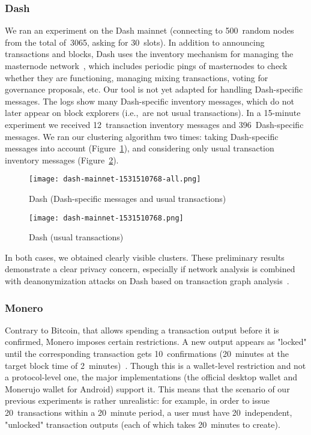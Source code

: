 \subsubsection{Dash}

We ran an experiment on the Dash mainnet (connecting to 500~random nodes from the total of~3065, asking for 30~slots).
In addition to announcing transactions and blocks, Dash uses the inventory mechanism for managing the masternode network~\cite{Schinzel2015}, which includes periodic pings of masternodes to check whether they are functioning, managing mixing transactions, voting for governance proposals, etc.
Our tool is not yet adapted for handling Dash-specific messages.
The logs show many Dash-specific inventory messages, which do not later appear on block explorers (i.e.,~are not usual transactions).
In a 15-minute experiment we received  12~transaction inventory messages and 396~Dash-specific messages.
We ran our clustering algorithm two times: taking Dash-specific messages into account (Figure~\ref{fig:dash-all}), and considering only usual transaction inventory messages (Figure~\ref{fig:dash-tx}).

\begin{figure}[!t]
	\texttt{[image: dash-mainnet-1531510768-all.png]}
	\caption{Dash (Dash-specific messages and usual transactions)}
	\label{fig:dash-all}
\end{figure}

\begin{figure}[!t]
	\texttt{[image: dash-mainnet-1531510768.png]}
	\caption{Dash (usual transactions)}
	\label{fig:dash-tx}
\end{figure}

In both cases, we obtained clearly visible clusters.
These preliminary results demonstrate a clear privacy concern, especially if network analysis is combined with deanonymization attacks on Dash based on transaction graph analysis~\cite{Kalodner2017}. 


\subsubsection{Monero}

Contrary to Bitcoin, that allows spending a transaction output before it is confirmed, Monero imposes certain restrictions.
A new output appears as "locked" until the corresponding transaction gets 10~confirmations (20~minutes at the target block time of 2~minutes)~\cite{dpzz2017}.
Though this is a wallet-level restriction and not a protocol-level one, the major implementations (the official desktop wallet and Monerujo wallet for Android) support it.
This means that the scenario of our previous experiments is rather unrealistic: for example, in order to issue 20~transactions within a 20~minute period, a user must have 20~independent, "unlocked" transaction outputs (each of which takes 20~minutes to create).

